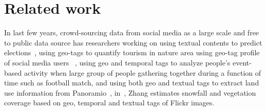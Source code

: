 \section{Related work}
In last few years, crowd-sourcing data from social media 
as a large scale and free to public data source
has 
researchers working on using textual contents to
predict elections~\cite{you2015multifacetedelections},
using geo-tags to quantify
tourism in nature area using geo-tag profile of social media users ~\cite{wood2013usingtourism},
using geo and temporal tags to analyze people's event-based activity 
when large group of people gathering together during a function of time 
such as football match,
and using both geo and textual tags to 
extract land use information from Panoramio~\cite{vsecerov2015analysis, oba2014towards}, 
in~\cite{ecology2012www}, 
Zhang \etal estimates snowfall and vegetation coverage 
based on geo, temporal and textual tags of Flickr images. 

